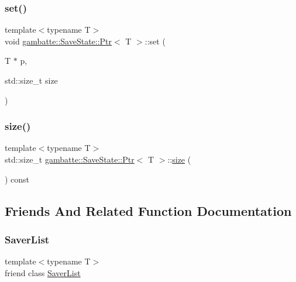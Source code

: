 \subsubsection{\texorpdfstring{set()}{set()}}
{\footnotesize\ttfamily template$<$typename T$>$ \\
void \hyperlink{classgambatte_1_1SaveState_1_1Ptr}{gambatte\+::\+Save\+State\+::\+Ptr}$<$ T $>$\+::set (\begin{DoxyParamCaption}\item[{T $\ast$}]{p,  }\item[{std\+::size\+\_\+t}]{size }\end{DoxyParamCaption})\hspace{0.3cm}{\ttfamily [inline]}}

\mbox{\label{classgambatte_1_1SaveState_1_1Ptr_a600e0bb965ba840c0f3fb6aadbb3b869}} 
\subsubsection{\texorpdfstring{size()}{size()}}
{\footnotesize\ttfamily template$<$typename T$>$ \\
std\+::size\+\_\+t \hyperlink{classgambatte_1_1SaveState_1_1Ptr}{gambatte\+::\+Save\+State\+::\+Ptr}$<$ T $>$\+::\hyperlink{ioapi_8h_a014d89bd76f74ef3a29c8f04b473eb76}{size} (\begin{DoxyParamCaption}{ }\end{DoxyParamCaption}) const\hspace{0.3cm}{\ttfamily [inline]}}



\subsection{Friends And Related Function Documentation}
\mbox{\label{classgambatte_1_1SaveState_1_1Ptr_aa5593b9169916e39c212a9e5cf267294}} 
\subsubsection{\texorpdfstring{Saver\+List}{SaverList}}
{\footnotesize\ttfamily template$<$typename T$>$ \\
friend class \hyperlink{classgambatte_1_1SaverList}{Saver\+List}\hspace{0.3cm}{\ttfamily [friend]}}

